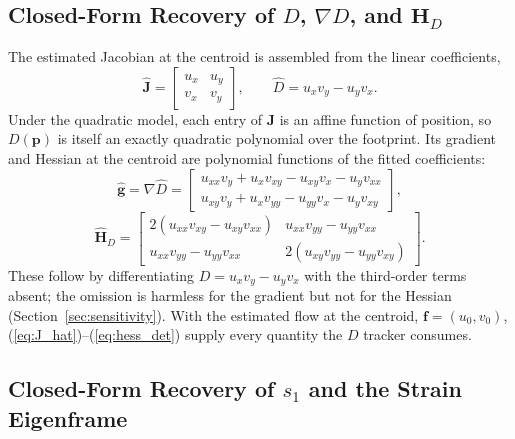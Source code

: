 \documentclass[lettersize,journal]{IEEEtran}
\begin{document}
\subsection{Closed-Form Recovery of $D$, $\nabla D$, and $\mathbf{H}_D$}

The estimated Jacobian at the centroid is assembled from the linear
coefficients,
\begin{equation}
    \hat{\mathbf{J}} =
    \begin{bmatrix} u_x & u_y \\ v_x & v_y \end{bmatrix},
    \qquad
    \hat{D} = u_x v_y - u_y v_x.
    \label{eq:J_hat}
\end{equation}
Under the quadratic model, each entry of $\mathbf{J}$ is an affine
function of position, so $D(\mathbf{p})$ is itself an exactly quadratic
polynomial over the footprint. Its gradient and Hessian at the centroid
are polynomial functions of the fitted coefficients:
\begin{equation}
    \hat{\mathbf{g}} = \nabla \hat{D} =
    \begin{bmatrix}
        u_{xx} v_y + u_x v_{xy} - u_{xy} v_x - u_y v_{xx} \\
        u_{xy} v_y + u_x v_{yy} - u_{yy} v_x - u_y v_{xy}
    \end{bmatrix},
    \label{eq:grad_det}
\end{equation}
\begin{equation}
    \hat{\mathbf{H}}_D =
    \begin{bmatrix}
        2(u_{xx} v_{xy} - u_{xy} v_{xx}) &
        u_{xx} v_{yy} - u_{yy} v_{xx} \\
        u_{xx} v_{yy} - u_{yy} v_{xx} &
        2(u_{xy} v_{yy} - u_{yy} v_{xy})
    \end{bmatrix}.
    \label{eq:hess_det}
\end{equation}
These follow by differentiating $D = u_x v_y - u_y v_x$ with the
third-order terms absent; the omission is harmless for the gradient but
not for the Hessian (Section~\ref{sec:sensitivity}). With the estimated
flow at the centroid, $\mathbf{f} = (u_0, v_0)$,
(\ref{eq:J_hat})--(\ref{eq:hess_det}) supply every quantity the $D$
tracker consumes.

\subsection{Closed-Form Recovery of $s_1$ and the Strain Eigenframe}
\label{sec:s1_estimation}
\end{document}
